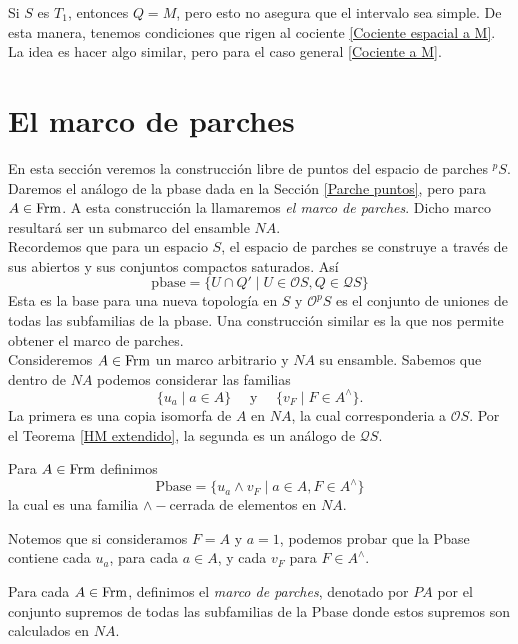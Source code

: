 Si $S$ es $T_1$, entonces $Q=M$, pero esto no asegura que el intervalo sea simple. De esta manera, tenemos condiciones que rigen al cociente \ref{Cociente espacial a M}. La idea es hacer algo similar, pero para 
el caso general \ref{Cociente a M}.

\section{El marco de parches}\label{Marco de parche}

En esta sección veremos la construcción libre de puntos del espacio de parches $^pS$. Daremos el análogo de la pbase dada en la Sección \ref{Parche puntos}, pero para $A\in \mathrm{Frm}$. A esta construcción la llamaremos \emph{el marco de parches}. Dicho marco resultará ser un submarco del ensamble $NA$.\\

Recordemos que para un espacio $S$, el espacio de parches se construye a través de sus abiertos y sus conjuntos compactos saturados. Así 
\[
\mbox{pbase}=\{U\cap Q'\mid U\in \mathcal{O}S, Q\in \mathcal{Q}S\}
\]
Esta es la base para una nueva topología en $S$ y $\mathcal{O}^pS$ es el conjunto de uniones de todas las subfamilias de la pbase. Una construcción similar es la que nos permite obtener el marco de parches. \\

Consideremos $A\in \mathrm{Frm}$ un marco arbitrario y $NA$ su ensamble. Sabemos que dentro de $NA$ podemos considerar las familias
\[
\{u_a\mid a\in A\}\quad\mbox{ y }\quad\{v_F\mid F\in A^\wedge\}.
\]
La primera es una copia isomorfa de $A$ en $NA$, la cual corresponderia a $\mathcal{O}S$. Por el Teorema \ref{HM extendido}, la segunda es un análogo de $\mathcal{Q}S$.

\begin{dfn}\label{Definición7.1.1}
    Para $A\in\mathrm{Frm}$ definimos
    \[
    \mbox{Pbase}=\{u_a\wedge v_F\mid a\in A, F\in A^\wedge\}
    \]
    la cual es una familia $\wedge-$cerrada de elementos en $NA$.
\end{dfn}

Notemos que si consideramos $F=A$ y $a=1$, podemos probar que la Pbase contiene cada $u_a$, para cada $a\in A$, y cada $v_F$ para $F\in A^\wedge$.

\begin{dfn}\label{Definicion7.1.2}
    Para cada $A\in \mathrm{Frm}$, definimos el \emph{marco de parches}, denotado por $PA$ por el conjunto supremos de todas las subfamilias de la Pbase donde estos supremos son calculados en $NA$.
\end{dfn}


